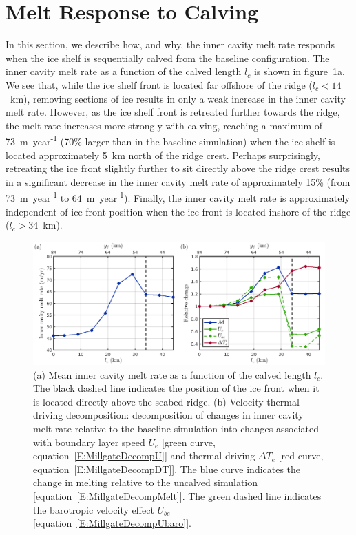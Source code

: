 \documentclass[draft]{agujournal2019}
\begin{document}
\section{Melt Response to Calving}\label{S:Results:lc}
In this section, we describe how, and why, the inner cavity melt rate responds when the ice shelf is sequentially calved from the baseline configuration. The inner cavity melt rate as a function of the calved length $l_c$ is shown in figure~\ref{fig:figure4}a. We see that, while the ice shelf front is located far offshore of the ridge ($l_c< 14$~km), removing sections of ice results in only a weak increase in the inner cavity melt rate. However, as the ice shelf front is retreated further towards the ridge, the melt rate increases more strongly with calving, reaching a maximum of 73~m~year\textsuperscript{-1} (70\% larger than in the baseline simulation) when the ice shelf is located approximately 5~km north of the ridge crest. Perhaps surprisingly, retreating the ice front slightly further to sit directly above the ridge crest results in a significant decrease in the inner cavity melt rate of approximately 15\% (from 73~m~year\textsuperscript{-1} to 64~m~year\textsuperscript{-1}). Finally, the inner cavity melt rate is approximately independent of ice front position when the ice front is located inshore of the ridge ($l_c>34$~km).

\begin{figure}
    \centering
    \includegraphics[width = \textwidth]{../make_figures/plots/figure4.png}
    \caption{(a) Mean inner cavity melt rate as a function of the calved length $l_c$. The black dashed line indicates the position of the ice front when it is located directly above the seabed ridge. (b) Velocity-thermal driving decomposition: decomposition of changes in inner cavity melt rate relative to the baseline simulation into changes associated with boundary layer speed $U_e$ [green curve, equation~\eqref{E:MillgateDecompU}] and thermal driving $\Delta T_e$ [red curve, equation~\eqref{E:MillgateDecompDT}]. The blue curve indicates the change in melting relative to the uncalved simulation [equation~\eqref{E:MillgateDecompMelt}]. The green dashed line indicates the barotropic velocity effect $U_{be}$ [equation~\eqref{E:MillgateDecompUbaro}].  }
    \label{fig:figure4}
\end{figure}
\end{document}
